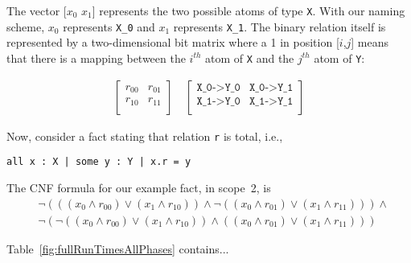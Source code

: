     The vector [$x_0$  $x_1$] represents the two possible atoms of type
    \texttt{X}.  With our naming scheme, $x_0$ represents \texttt{X\_0} and $x_1$
    represents \texttt{X\_1}.
    The binary relation itself is represented by a two-dimensional bit matrix where a 1 in
    position [$i$,$j$] means that there is a mapping between the $i^{th}$ atom of \texttt{X}
    and the $j^{th}$ atom of \texttt{Y}:

    \begin{gather*}
    \begin{bmatrix}
      r_{00} & r_{01} \\
      r_{10} & r_{11} \\
    \end{bmatrix} \quad
    \begin{bmatrix}
      \texttt{X\_0->Y\_0} & \texttt{X\_0->Y\_1} \\
      \texttt{X\_1->Y\_0} & \texttt{X\_1->Y\_1} \\
    \end{bmatrix}
    \end{gather*}
    \medskip

    Now, consider a fact stating that relation \texttt{r} is total, i.e.,

    \begin{center}
    \texttt{all x :~X | some y :~Y | x.r = y}
    \end{center}

    The CNF formula for our example fact, in scope~2, is
    \begin{equation*}
    \begin{split}
    & \neg(((x_0 \wedge r_{00}) \vee (x_1 \wedge r_{10})) \wedge \neg((x_0 \wedge r_{01})
    \vee (x_1 \wedge r_{11}))) \wedge \\ &\neg(\neg((x_0 \wedge r_{00}) \vee (x_1 \wedge
    r_{10})) \wedge ((x_0 \wedge r_{01}) \vee (x_1 \wedge r_{11})))
    \end{split}
    \end{equation*}
    \medskip

    Table~\vref{fig:fullRunTimesAllPhases} contains...

